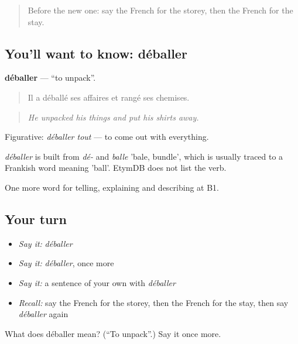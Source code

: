 \label{lesson:FR-C426-deballer}



\begin{quote}
Before the new one: say the French for the storey, then the French for the stay.
\end{quote}

\subsection*{You'll want to know: déballer}
\textbf{déballer} — \textquotedblleft{}to unpack\textquotedblright{}.

\begin{quote}
Il a déballé ses affaires et rangé ses chemises.
\end{quote}

\begin{quote}
\emph{He unpacked his things and put his shirts away.}
\end{quote}

Figurative: \emph{déballer tout} — to come out with everything.

\begin{cousinweb}
\emph{déballer} is built from \emph{dé-} and \emph{balle} 'bale, bundle', which is usually traced to a Frankish word meaning 'ball'. EtymDB does not list the verb.
\end{cousinweb}

\begin{grammarlens}[title={What you've built}]
One more word for telling, explaining and describing at B1.
\end{grammarlens}

\subsection*{Your turn}
\begin{itemize}
\raggedright
  \item \emph{Say it:} \emph{déballer}
  \item \emph{Say it:} \emph{déballer}, once more
  \item \emph{Say it:} a sentence of your own with \emph{déballer}
  \item \emph{Recall:} say the French for the storey, then the French for the stay, then say \emph{déballer} again
\end{itemize}

\begin{tcolorbox}[breakable,colback=teal!4,colframe=teal!35!black,title={Before you move on}]
What does déballer mean? (\textquotedblleft{}To unpack\textquotedblright{}.) Say it once more.
\end{tcolorbox}
